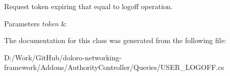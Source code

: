 Request token expiring that equal to logoff operation. 


\begin{DoxyParams}{Parameters}
{\em token} & \\
\hline
\end{DoxyParams}


The documentation for this class was generated from the following file\+:\begin{DoxyCompactItemize}
\item 
D\+:/\+Work/\+Git\+Hub/doloro-\/networking-\/framework/\+Addons/\+Authority\+Controller/\+Queries/U\+S\+E\+R\+\_\+\+L\+O\+G\+O\+F\+F.\+cs\end{DoxyCompactItemize}
